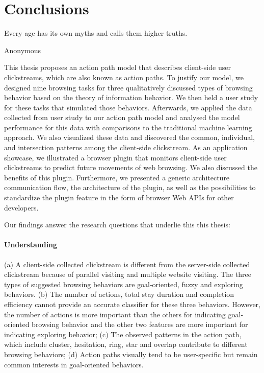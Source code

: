 \section{Conclusions}
\label{ch:final}

\epigraph{Every age has its own myths and calls them higher truths.}{Anonymous}



This thesis proposes an action path model that describes client-side user clickstreams,
which are also known as action paths.
To justify our model, we designed nine browsing tasks for three qualitatively
discussed types of browsing behavior based on the theory of information behavior. We then 
held a user study for these tasks that simulated those behaviors. 
Afterwards, we applied the data collected from user study to our action path model and
analysed the model performance for this data with comparisons to the traditional machine 
learning approach.
We also visualized these data and discovered the common, 
individual, and intersection patterns among the client-side clickstream.
As an application showcase, we illustrated a browser plugin that monitors client-side 
user clickstreams to predict future movements of web browsing. 
We also discussed the benefits of this plugin.
Furthermore, we presented a generic architecture communication flow, the architecture of the plugin, 
as well as the possibilities to standardize the plugin feature in the form of browser 
Web APIs for other developers.


Our findings answer the research questions that underlie this this thesis:

\paragraph{Understanding} 
(a) A client-side collected clickstream is different from the 
server-side collected clickstream because of parallel visiting 
and multiple website visiting. The three types of suggested browsing behaviors are
goal-oriented, fuzzy and exploring behaviors.
(b) The number of actions, total stay duration and completion efficiency cannot 
provide an accurate classifier for these three behaviors. However, 
the number of actions is more important than the others for indicating 
goal-oriented browsing behavior and the other two features are more important 
for indicating exploring behavior;
(c) The observed patterns in the action path, which include cluster, hesitation, ring, 
star and overlap contribute to different browsing behaviors;
(d) Action paths visually tend to be user-specific but remain common interests 
in goal-oriented behaviors.
